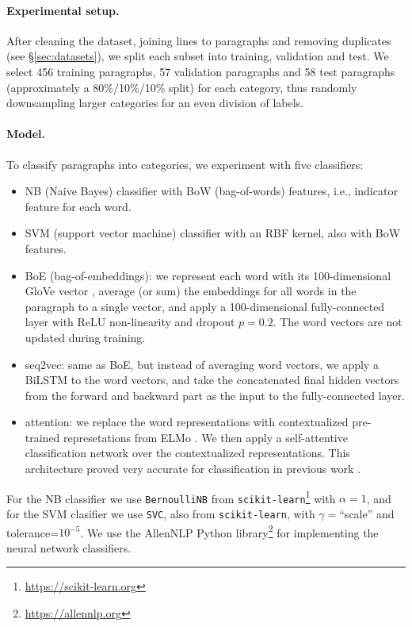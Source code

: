 \documentclass[11pt,a4paper,table]{article}
\begin{document}
\paragraph{Experimental setup.}

After cleaning the dataset, joining lines to paragraphs and removing duplicates
(see \S\ref{sec:datasets}), we split each subset into training, validation and test.
We select 456 training paragraphs, 57 validation paragraphs and
58 test paragraphs (approximately a 80\%/10\%/10\% split) for each category,
thus randomly downsampling larger categories for an even division of labels.

\paragraph{Model.}

To classify paragraphs into categories, we experiment with five classifiers:

\begin{itemize}
  \item NB (Naive Bayes) classifier
  with BoW (bag-of-words) features, i.e., indicator feature for each word.
  \item SVM (support vector machine) classifier with an RBF kernel,
  also with BoW features.
  \item BoE (bag-of-embeddings): we represent each word with its 100-dimensional
  GloVe vector \cite{pennington2014glove}, average (or sum) the embeddings for all words in the paragraph
  to a single vector, and apply a 100-dimensional fully-connected layer with
  ReLU non-linearity and dropout $p=0.2$.
  The word vectors are not updated during training.
  \item seq2vec: same as BoE, but instead of averaging word vectors,
  we apply a BiLSTM to the word vectors, and take the concatenated
  final hidden vectors from the forward and backward part as the input to the
  fully-connected layer.
  \item attention: we replace the word representations with contextualized
  pre-trained represetations from ELMo \cite{Peters:2018}. We then apply a self-attentive
  classification network \cite{mccann2017learned} over the contextualized representations. This architecture proved very accurate for classification in
  previous work \cite{W18-5427,D18-1401}.
\end{itemize}

For the NB classifier we use \texttt{BernoulliNB} from
\texttt{scikit-learn}\footnote{\url{https://scikit-learn.org}}
with $\alpha=1$,
and for the SVM clasifier we use \texttt{SVC}, also from \texttt{scikit-learn},
with $\gamma=$``scale'' and tolerance=$10^{-5}$.
We use the AllenNLP Python library\footnote{\url{https://allennlp.org}}
\cite{Gardner2017AllenNLP} for implementing the neural network classifiers.
\end{document}
